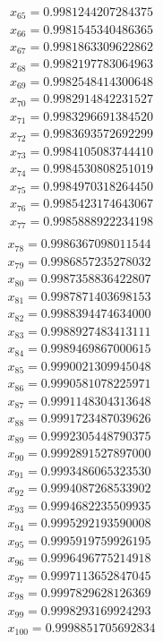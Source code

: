 \begin{multicols}{3}
\begin{align*}
		x_{65} = 0.9981244207284375\\
		x_{66} = 0.9981545340486365\\
		x_{67} = 0.9981863309622862\\
		x_{68} = 0.9982197783064963\\
		x_{69} = 0.9982548414300648\\
		x_{70} = 0.9982914842231527\\
		x_{71} = 0.9983296691384520\\
		x_{72} = 0.9983693572692299\\
		x_{73} = 0.9984105083744410\\
		x_{74} = 0.9984530808251019\\
		x_{75} = 0.9984970318264450\\
		x_{76} = 0.9985423174643067\\
		x_{77} = 0.9985888922234198\\
	\end{align*}
	\vfill
	\columnbreak
	\begin{align*}
		x_{78} = 0.9986367098011544\\
		x_{79} = 0.9986857235278032\\
		x_{80} = 0.9987358836422807\\
		x_{81} = 0.9987871403698153\\
		x_{82} = 0.9988394474634000\\
		x_{83} = 0.9988927483413111\\
		x_{84} = 0.9989469867000615\\
		x_{85} = 0.9990021309945048\\
		x_{86} = 0.9990581078225971\\
		x_{87} = 0.9991148304313648\\
		x_{88} = 0.9991723487039626\\
		x_{89} = 0.9992305448790375\\
		x_{90} = 0.9992891527897000\\
		x_{91} = 0.9993486065323530\\
		x_{92} = 0.9994087268533902\\
		x_{93} = 0.9994682235509935\\
		x_{94} = 0.9995292193590008\\
		x_{95} = 0.9995919759926195\\
		x_{96} = 0.9996496775214918\\
		x_{97} = 0.9997113652847045\\
		x_{98} = 0.9997829628126369\\
		x_{99} = 0.9998293169924293\\
		x_{100} = 0.9998851705692834
	\end{align*}
	\vfill
\end{multicols}

